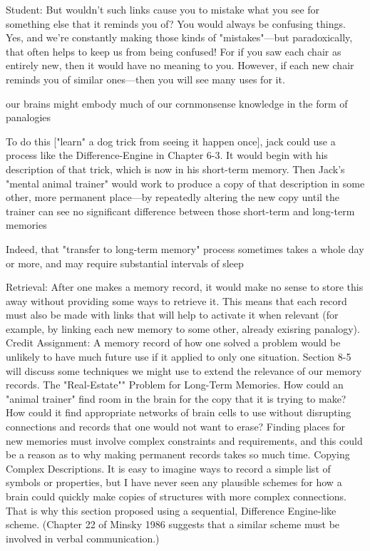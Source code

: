 \documentclass[10pt,a4paper]{article}
\begin{document}
Student: But wouldn't such links cause you to mistake what you see for something else that it reminds you of? You would always be confusing things.
Yes, and we're constantly making those kinds of "mistakes"—but paradoxically, that often helps to keep us from being confused! For if you saw each chair as entirely new, then it would have no meaning to you. However, if each new chair reminds you of similar ones—then you will see many uses for it. \cite[p.~266]{minsky}

our brains might embody much of our cornmonsense knowledge in the form of panalogies \cite[p.~267]{minsky}

To do this ["learn" a dog trick from seeing it happen once], jack could use a process like the Difference-Engine in Chapter 6-3. It would begin with his description of that trick, which is now in his short-term memory. Then Jack's "mental animal trainer" would work to produce a copy of that description in some other, more permanent place—by repeatedly altering the new copy until the trainer can see no significant difference between those short-term and long-term memories \cite[p.~268]{minsky}

Indeed, that "transfer to long-term memory" process sometimes takes a whole day or more, and may require substantial intervals of sleep \cite[p.~269]{minsky}

Retrieval: After one makes a memory record, it would make no sense to store this away without providing some ways to retrieve it. This means that each record must also be made with links that will help to activate it when relevant (for example, by linking each new memory to some other, already exisring panalogy).
Credit Assignment: A memory record of how one solved a problem would be unlikely to have much future use if it applied to only one situation. Section 8-5 will discuss some techniques we might use to extend the relevance of our memory records.
The "Real-Estate"" Problem for Long-Term Memories. How could an "animal trainer" find room in the brain for the copy that it is trying to make? How could it find appropriate networks of brain cells to use without disrupting connections and records that one would not want to erase? Finding places for new memories must involve complex constraints and requirements, and this could be a reason as to why making permanent records takes so much time.
Copying Complex Descriptions. It is easy to imagine ways to record a simple list of symbols or properties, but I have never seen any plausible schemes for how a brain could quickly make copies of structures with more complex connections. That is why this section proposed using a sequential, Difference Engine-like scheme. (Chapter 22 of Minsky 1986 suggests that a similar scheme must be involved in verbal communication.) \cite[p.~270]{minsky}
\end{document}
